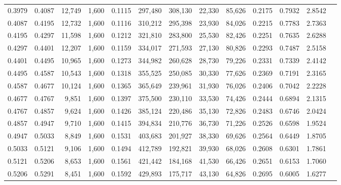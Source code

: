 \begin{tabular}{rrrrrrrrrrrrr}
0.3979 & 0.4087 & 12,749 & 1,600 &                                     0.1115 & 297,480 & 308,130 &  22,330 &  85,626 & 0.2175 & 0.7932 & 2.8542 \\
0.4087 & 0.4195 & 12,732 & 1,600 &                                     0.1116 & 310,212 & 295,398 &  23,930 &  84,026 & 0.2215 & 0.7783 & 2.7363 \\
0.4195 & 0.4297 & 11,598 & 1,600 &                                     0.1212 & 321,810 & 283,800 &  25,530 &  82,426 & 0.2251 & 0.7635 & 2.6288 \\
0.4297 & 0.4401 & 12,207 & 1,600 &                                     0.1159 & 334,017 & 271,593 &  27,130 &  80,826 & 0.2293 & 0.7487 & 2.5158 \\
0.4401 & 0.4495 & 10,965 & 1,600 &                                     0.1273 & 344,982 & 260,628 &  28,730 &  79,226 & 0.2331 & 0.7339 & 2.4142 \\
0.4495 & 0.4587 & 10,543 & 1,600 &                                     0.1318 & 355,525 & 250,085 &  30,330 &  77,626 & 0.2369 & 0.7191 & 2.3165 \\
0.4587 & 0.4677 & 10,124 & 1,600 &                                     0.1365 & 365,649 & 239,961 &  31,930 &  76,026 & 0.2406 & 0.7042 & 2.2228 \\
0.4677 & 0.4767 &  9,851 & 1,600 &                                     0.1397 & 375,500 & 230,110 &  33,530 &  74,426 & 0.2444 & 0.6894 & 2.1315 \\
0.4767 & 0.4857 &  9,624 & 1,600 &                                     0.1426 & 385,124 & 220,486 &  35,130 &  72,826 & 0.2483 & 0.6746 & 2.0424 \\
0.4857 & 0.4947 &  9,710 & 1,600 &                                     0.1415 & 394,834 & 210,776 &  36,730 &  71,226 & 0.2526 & 0.6598 & 1.9524 \\
0.4947 & 0.5033 &  8,849 & 1,600 &                                     0.1531 & 403,683 & 201,927 &  38,330 &  69,626 & 0.2564 & 0.6449 & 1.8705 \\
0.5033 & 0.5121 &  9,106 & 1,600 &                                     0.1494 & 412,789 & 192,821 &  39,930 &  68,026 & 0.2608 & 0.6301 & 1.7861 \\
0.5121 & 0.5206 &  8,653 & 1,600 &                                     0.1561 & 421,442 & 184,168 &  41,530 &  66,426 & 0.2651 & 0.6153 & 1.7060 \\
0.5206 & 0.5291 &  8,451 & 1,600 &                                     0.1592 & 429,893 & 175,717 &  43,130 &  64,826 & 0.2695 & 0.6005 & 1.6277 \\

\end{tabular}
